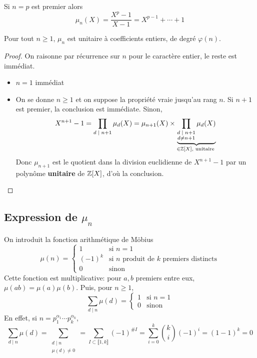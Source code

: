 \begin{rem}
Si $n=p$ est premier alors \[
    \mu_n(X)=\frac{X^p-1}{X-1}=X^{p-1}+\cdots +1
\]
\end{rem}

\begin{prop}
Pour tout $n\geq 1$, $\mu_n$ est unitaire à coefficients entiers, de degré $\varphi(n)$.
\end{prop}

\begin{proof}
On raisonne par récurrence sur $n$ pour le caractère entier, le reste est immédiat.
\begin{itemize}
    \item $n=1$ immédiat
    \item On se donne $n\geq 1$ et on suppose la propriété vraie jusqu'au rang $n$. Si $n+1$ est premier, la conclusion est immédiate. Sinon, \[
        X^{n+1}-1=\prod_{d\;|\;n+1}\mu_d(X)=\mu_{n+1}(X)\times
        \underbrace{\prod_{\substack{d\;|\;n+1\\ d\neq n+1}}\mu_d(X)}_{\in\mathbb Z[X], \text{ unitaire }}
    \]
    Donc $\mu_{n+1}$ est le quotient dans la division euclidienne de $X^{n+1}-1$ par un polynôme \textbf{unitaire} de $\mathbb Z[X]$, d'où la conclusion.
\end{itemize}
\end{proof}

\subsection{Expression de $\mu_n$}

On introduit la fonction arithmétique de Möbius \[
    \mu(n)=\begin{cases}
        1 &\text{si } n=1 \\
        (-1)^k &\text{si }n\text{ produit de $k$ premiers distincts}\\
        0 &\text{sinon}
    \end{cases}
\]
Cette fonction est multiplicative: pour $a, b$ premiers entre eux, $\mu(ab)=\mu(a)\mu(b)$. Puis, pour $n\geq 1$, \[
    \sum_{d\;|\;n}\mu(d)=\begin{cases}
        1&\text{si }n=1 \\
        0&\text{sinon}
    \end{cases}
\]
En effet, si $n=p_1^{\alpha_1}\cdots p_k^{\alpha_k}$, \[
    \sum_{d\;|\;n}\mu(d)=\sum_{\substack{d\;|\; n\\\mu(d)\neq 0}}=\sum_{I\subset \llbracket 1, k\rrbracket}(-1)^{\#I}=\sum_{i=0}^k\binom ki(-1)^i=(1-1)^k=0
\]

